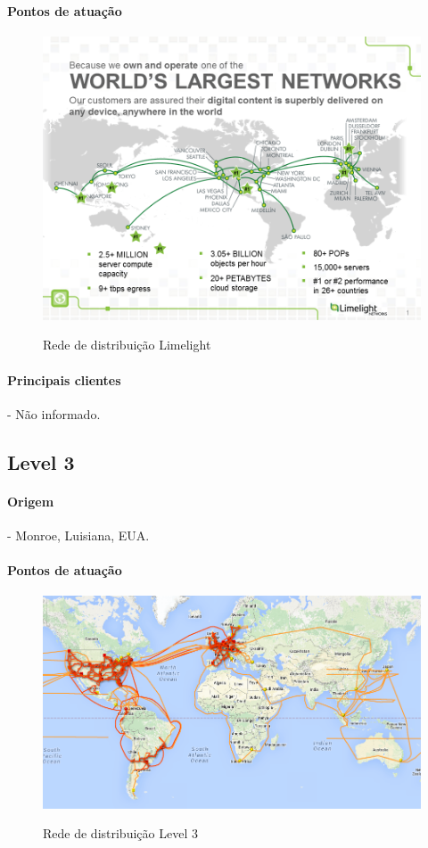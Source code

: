 \paragraph{Pontos de atua\c{c}\~ao}
\begin{figure}[H]
\caption{Rede de distribui\c{c}\~ao Limelight}
\includegraphics[width=12cm]{Figuras/limelight_map.png} 
\label{figura:limelight_map}
\end{figure}
\paragraph{Principais clientes}- N\~ao informado.
\subsection{Level 3}
\paragraph{Origem}- Monroe, Luisiana, EUA. 
\paragraph{Pontos de atua\c{c}\~ao}
\begin{figure}[H]
\caption{Rede de distribui\c{c}\~ao Level 3}
\includegraphics[width=12cm]{Figuras/level3_map.png} 
\label{figura:level3_map}
\end{figure}
